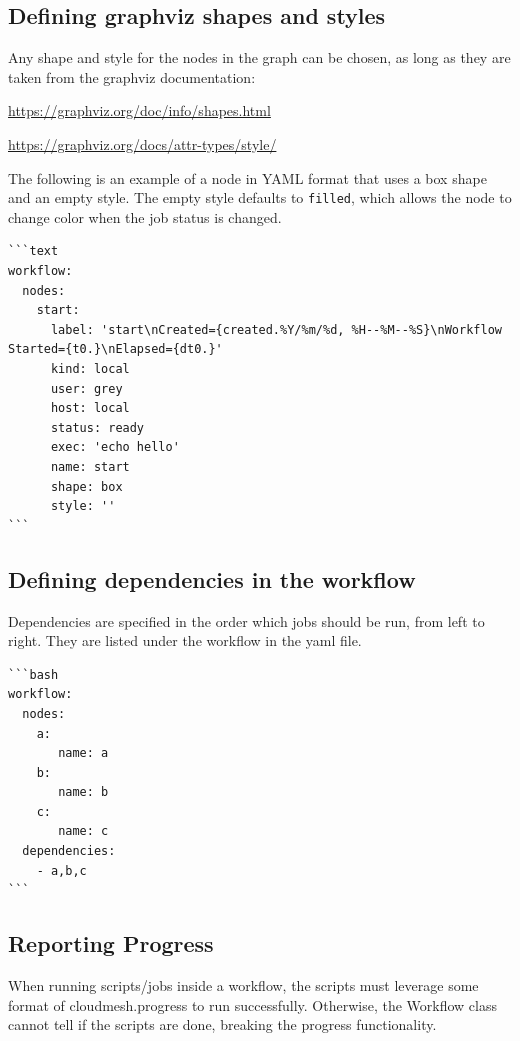 \subsection{Defining graphviz shapes and
styles}\label{defining-graphviz-shapes-and-styles}

Any shape and style for the nodes in the graph can be chosen, as long as
they are taken from the graphviz documentation:

\url{https://graphviz.org/doc/info/shapes.html}

\url{https://graphviz.org/docs/attr-types/style/}

The following is an example of a node in YAML format that uses a box
shape and an empty style. The empty style defaults to \texttt{filled},
which allows the node to change color when the job status is changed.

\begin{verbatim}
```text
workflow:
  nodes:
    start:
      label: 'start\nCreated={created.%Y/%m/%d, %H--%M--%S}\nWorkflow Started={t0.}\nElapsed={dt0.}'
      kind: local
      user: grey
      host: local
      status: ready
      exec: 'echo hello'
      name: start
      shape: box
      style: ''
```
\end{verbatim}

\subsection{Defining dependencies in the
workflow}\label{defining-dependencies-in-the-workflow}

Dependencies are specified in the order which jobs should be run, from
left to right. They are listed under the workflow in the yaml file.

\begin{verbatim}
```bash
workflow:
  nodes:
    a:
       name: a
    b:
       name: b
    c:
       name: c
  dependencies:
    - a,b,c
```
\end{verbatim}

\subsection{Reporting Progress}\label{reporting-progress}

When running scripts/jobs inside a workflow, the scripts must leverage
some format of cloudmesh.progress to run successfully. Otherwise, the
Workflow class cannot tell if the scripts are done, breaking the
progress functionality.

